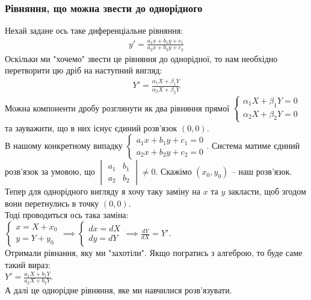 \documentclass[a4paper, 10pt]{article}
\theoremstyle{theoremdd}
\theoremstyle{theoremdd}
\theoremstyle{theoremdd}
\theoremstyle{theoremdd}
\theoremstyle{theoremdd}
\theoremstyle{theoremdd}
\theoremstyle{theoremdd}
\theoremstyle{theoremdd}
\begin{document}
	\subsubsection{Рівняння, що можна звести до однорідного}
	Нехай задане ось таке диференціальне рівняння:
	\begin{align*}
	y' = \frac{a_1 x + b_1 y + c_1}{a_2 x + b_2 y + c_2}
	\end{align*}
	Оскільки ми "хочемо" звести це рівняння до однорідної, то нам необхідно перетворити цю дріб на наступний вигляд:
	\begin{align*}
	Y' = \frac{\alpha_1 X + \beta_1 Y}{\alpha_2 X + \beta_2 Y}
	\end{align*}
	Можна компоненти дробу розглянути як два рівняння прямої $\begin{cases}
	\alpha_1 X + \beta_1 Y = 0\\
	\alpha_2 X + \beta_2 Y = 0
	\end{cases}
	$ та зауважити, що в них існує єдиний розв'язок $(0,0)$.\\
	В нашому конкретному випадку $\begin{cases}
	a_1 x + b_1 y + c_1 = 0\\
	a_2 x + b_2 y + c_2 = 0
	\end{cases}
	$. Система матиме єдиний розв'язок за умовою, що $\begin{vmatrix} a_1 & b_1 \\ a_2 & b_2 \end{vmatrix} \neq 0$. Скажімо $(x_0, y_0)$ -- наш розв'язок. Тепер для однорідного вигляду я хочу таку заміну на $x$ та $y$ закласти, щоб згодом вони перетнулись в точку $(0,0)$.\\
	Тоді проводиться ось така заміна:\\
	$\begin{cases}
	x = X + x_0\\
	y = Y + y_0
	\end{cases} \implies
	\begin{cases}
	dx = dX\\
	dy = dY
	\end{cases}
	\implies \displaystyle \frac{dY}{dX} = Y'
	$.\\
	Отримали рівнання, яку ми "захотіли". Якщо погратись з алгеброю, то буде саме такий вираз:\\
	$\displaystyle Y' = \frac{a_1 X + b_1 Y}{a_2 X + b_2 Y}$.\\
	А далі це однорідне рівняння, яке ми навчилися розв'язувати.
	
\end{document}
